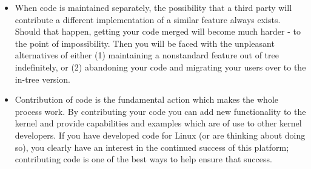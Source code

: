 \documentclass[a4paper,8pt,english]{sphinxmanual}
\begin{document}
\begin{itemize}
\item {} 
When code is maintained separately, the possibility that a third party
will contribute a different implementation of a similar feature always
exists.  Should that happen, getting your code merged will become much
harder - to the point of impossibility.  Then you will be faced with the
unpleasant alternatives of either (1) maintaining a nonstandard feature
out of tree indefinitely, or (2) abandoning your code and migrating your
users over to the in-tree version.

\item {} 
Contribution of code is the fundamental action which makes the whole
process work.  By contributing your code you can add new functionality to
the kernel and provide capabilities and examples which are of use to
other kernel developers.  If you have developed code for Linux (or are
thinking about doing so), you clearly have an interest in the continued
success of this platform; contributing code is one of the best ways to
help ensure that success.

\end{itemize}
\end{document}
